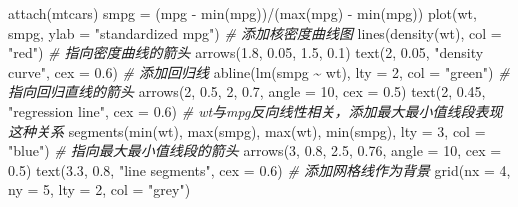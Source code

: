 \documentclass[
]{book}
\newenvironment{Shaded}{\begin{snugshade}}{\end{snugshade}}
\newcommand{\AttributeTok}[1]{\textcolor[rgb]{0.77,0.63,0.00}{#1}}
\newcommand{\CommentTok}[1]{\textcolor[rgb]{0.56,0.35,0.01}{\textit{#1}}}
\newcommand{\DecValTok}[1]{\textcolor[rgb]{0.00,0.00,0.81}{#1}}
\newcommand{\FloatTok}[1]{\textcolor[rgb]{0.00,0.00,0.81}{#1}}
\newcommand{\FunctionTok}[1]{\textcolor[rgb]{0.00,0.00,0.00}{#1}}
\newcommand{\NormalTok}[1]{#1}
\newcommand{\OtherTok}[1]{\textcolor[rgb]{0.56,0.35,0.01}{#1}}
\newcommand{\SpecialCharTok}[1]{\textcolor[rgb]{0.00,0.00,0.00}{#1}}
\newcommand{\StringTok}[1]{\textcolor[rgb]{0.31,0.60,0.02}{#1}}
\begin{document}
\begin{Shaded}
\begin{Highlighting}[]
\FunctionTok{attach}\NormalTok{(mtcars)}
\NormalTok{smpg }\OtherTok{=}\NormalTok{ (mpg }\SpecialCharTok{{-}} \FunctionTok{min}\NormalTok{(mpg))}\SpecialCharTok{/}\NormalTok{(}\FunctionTok{max}\NormalTok{(mpg) }\SpecialCharTok{{-}} \FunctionTok{min}\NormalTok{(mpg))}
\FunctionTok{plot}\NormalTok{(wt, smpg, }\AttributeTok{ylab =} \StringTok{"standardized mpg"}\NormalTok{)}
\CommentTok{\# 添加核密度曲线图}
\FunctionTok{lines}\NormalTok{(}\FunctionTok{density}\NormalTok{(wt), }\AttributeTok{col =} \StringTok{"red"}\NormalTok{)}
\CommentTok{\# 指向密度曲线的箭头}
\FunctionTok{arrows}\NormalTok{(}\FloatTok{1.8}\NormalTok{, }\FloatTok{0.05}\NormalTok{, }\FloatTok{1.5}\NormalTok{, }\FloatTok{0.1}\NormalTok{)}
\FunctionTok{text}\NormalTok{(}\DecValTok{2}\NormalTok{, }\FloatTok{0.05}\NormalTok{, }\StringTok{"density curve"}\NormalTok{, }\AttributeTok{cex =} \FloatTok{0.6}\NormalTok{)}
\CommentTok{\# 添加回归线}
\FunctionTok{abline}\NormalTok{(}\FunctionTok{lm}\NormalTok{(smpg }\SpecialCharTok{\textasciitilde{}}\NormalTok{ wt), }\AttributeTok{lty =} \DecValTok{2}\NormalTok{, }\AttributeTok{col =} \StringTok{"green"}\NormalTok{)}
\CommentTok{\# 指向回归直线的箭头}
\FunctionTok{arrows}\NormalTok{(}\DecValTok{2}\NormalTok{, }\FloatTok{0.5}\NormalTok{, }\DecValTok{2}\NormalTok{, }\FloatTok{0.7}\NormalTok{, }\AttributeTok{angle =} \DecValTok{10}\NormalTok{, }\AttributeTok{cex =} \FloatTok{0.5}\NormalTok{)}
\FunctionTok{text}\NormalTok{(}\DecValTok{2}\NormalTok{, }\FloatTok{0.45}\NormalTok{, }\StringTok{"regression line"}\NormalTok{, }\AttributeTok{cex =} \FloatTok{0.6}\NormalTok{)}
\CommentTok{\# wt与mpg反向线性相关，添加最大最小值线段表现这种关系}
\FunctionTok{segments}\NormalTok{(}\FunctionTok{min}\NormalTok{(wt), }\FunctionTok{max}\NormalTok{(smpg), }\FunctionTok{max}\NormalTok{(wt), }\FunctionTok{min}\NormalTok{(smpg), }\AttributeTok{lty =} \DecValTok{3}\NormalTok{, }\AttributeTok{col =} \StringTok{"blue"}\NormalTok{)}
\CommentTok{\# 指向最大最小值线段的箭头}
\FunctionTok{arrows}\NormalTok{(}\DecValTok{3}\NormalTok{, }\FloatTok{0.8}\NormalTok{, }\FloatTok{2.5}\NormalTok{, }\FloatTok{0.76}\NormalTok{, }\AttributeTok{angle =} \DecValTok{10}\NormalTok{, }\AttributeTok{cex =} \FloatTok{0.5}\NormalTok{)}
\FunctionTok{text}\NormalTok{(}\FloatTok{3.3}\NormalTok{, }\FloatTok{0.8}\NormalTok{, }\StringTok{"line segments"}\NormalTok{, }\AttributeTok{cex =} \FloatTok{0.6}\NormalTok{)}
\CommentTok{\# 添加网格线作为背景}
\FunctionTok{grid}\NormalTok{(}\AttributeTok{nx =} \DecValTok{4}\NormalTok{, }\AttributeTok{ny =} \DecValTok{5}\NormalTok{, }\AttributeTok{lty =} \DecValTok{2}\NormalTok{, }\AttributeTok{col =} \StringTok{"grey"}\NormalTok{)}
\end{Highlighting}
\end{Shaded}
\end{document}
